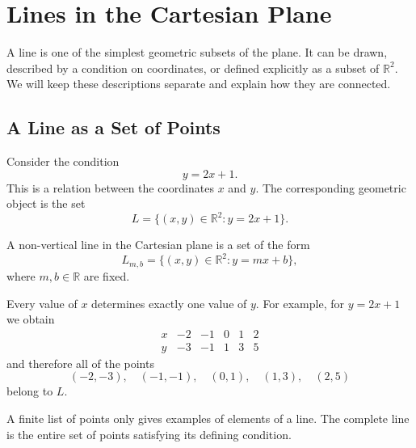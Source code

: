 \section{Lines in the Cartesian Plane}

A line is one of the simplest geometric subsets of the plane. It can be drawn,
described by a condition on coordinates, or defined explicitly as a subset of
$\mathbb{R}^2$. We will keep these descriptions separate and explain how they
are connected.

\subsection{A Line as a Set of Points}

Consider the condition
\[
y=2x+1.
\]
This is a relation between the coordinates $x$ and $y$. The corresponding
geometric object is the set
\[
L=\{(x,y)\in\mathbb{R}^2:y=2x+1\}.
\]

\begin{definitionbox}
A non-vertical line in the Cartesian plane is a set of the form
\[
L_{m,b}=\{(x,y)\in\mathbb{R}^2:y=mx+b\},
\]
where $m,b\in\mathbb{R}$ are fixed.
\end{definitionbox}

Every value of $x$ determines exactly one value of $y$. For example, for
$y=2x+1$ we obtain
\[
\begin{array}{c|ccccc}
x&-2&-1&0&1&2\\
\hline
y&-3&-1&1&3&5
\end{array}
\]
and therefore all of the points
\[
(-2,-3),\quad(-1,-1),\quad(0,1),\quad(1,3),\quad(2,5)
\]
belong to $L$.

\begin{center}
\end{center}

\begin{remarkbox}
A finite list of points only gives examples of elements of a line. The complete
line is the entire set of points satisfying its defining condition.
\end{remarkbox}


